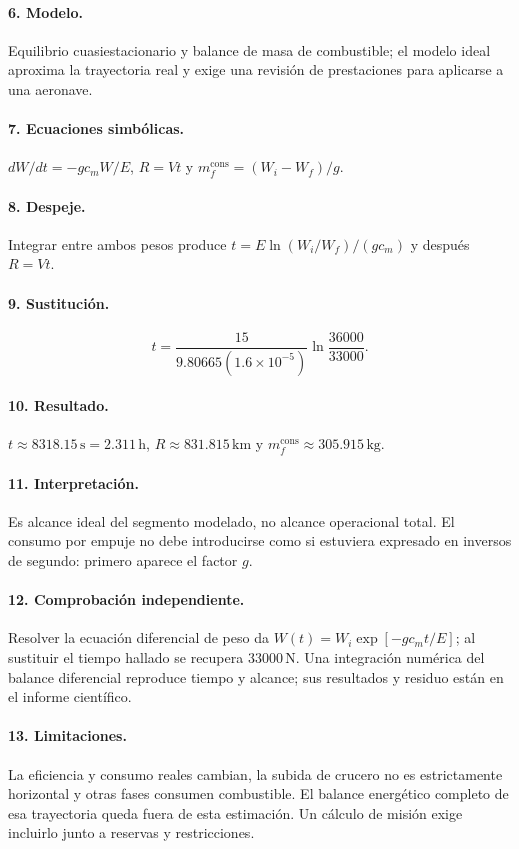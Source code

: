 \paragraph{6. Modelo.} Equilibrio cuasiestacionario y balance de masa de combustible; el modelo ideal aproxima la trayectoria real y exige una revisión de prestaciones para aplicarse a una aeronave.
\paragraph{7. Ecuaciones simbólicas.} $dW/dt=-gc_m W/E$, $R=Vt$ y $m_f^{\mathrm{cons}}=(W_i-W_f)/g$.
\paragraph{8. Despeje.} Integrar entre ambos pesos produce $t=E\ln(W_i/W_f)/(gc_m)$ y después $R=Vt$.
\paragraph{9. Sustitución.}
\[
 t=\frac{15}{9.80665(1.6\times10^{-5})}\ln\frac{36000}{33000}.
\]
\paragraph{10. Resultado.} $t\approx8318.15\,\mathrm s=2.311\,\mathrm h$, $R\approx831.815\,\mathrm{km}$ y $m_f^{\mathrm{cons}}\approx305.915\,\mathrm{kg}$.
\paragraph{11. Interpretación.} Es alcance ideal del segmento modelado, no alcance operacional total. El consumo por empuje no debe introducirse como si estuviera expresado en inversos de segundo: primero aparece el factor $g$.
\paragraph{12. Comprobación independiente.} Resolver la ecuación diferencial de peso da $W(t)=W_i\exp[-gc_mt/E]$; al sustituir el tiempo hallado se recupera $33000\,\mathrm N$. Una integración numérica del balance diferencial reproduce tiempo y alcance; sus resultados y residuo están en el informe científico.
\paragraph{13. Limitaciones.} La eficiencia y consumo reales cambian, la subida de crucero no es estrictamente horizontal y otras fases consumen combustible. El balance energético completo de esa trayectoria queda fuera de esta estimación. Un cálculo de misión exige incluirlo junto a reservas y restricciones.

